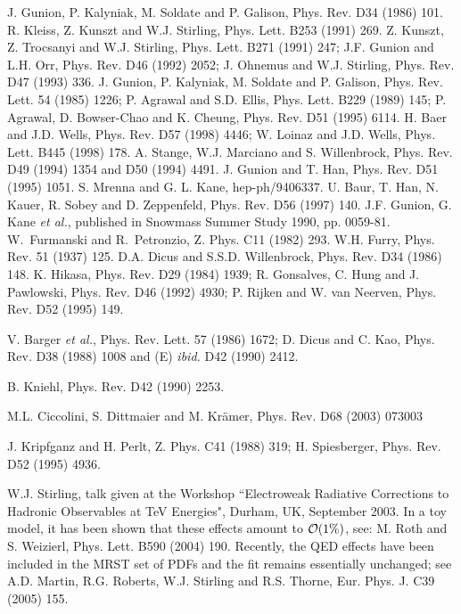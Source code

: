 \begin{thebibliography}{999}
J. Gunion, P. Kalyniak, M. Soldate and P. Galison, Phys. Rev. D34 (1986) 101. 
%
 R. Kleiss, Z. Kunszt and W.J. Stirling, Phys. Lett. 
B253  (1991) 269. 
%
 Z. Kunszt, Z. Trocsanyi and W.J. Stirling, Phys. Lett. 
B271 (1991) 247; J.F. Gunion and L.H. Orr, Phys. Rev. D46 (1992) 2052; 
J. Ohnemus and W.J. Stirling, Phys. Rev. D47 (1993) 336.
%
 J. Gunion, P. Kalyniak, M. Soldate and P. Galison, Phys. 
Rev. Lett. 54 (1985) 1226; P. Agrawal and  S.D. Ellis, Phys. Lett. B229 (1989)
145; P. Agrawal, D. Bowser-Chao and K. Cheung, Phys. Rev. D51 (1995) 6114. 
%
 H. Baer and J.D. Wells, Phys. Rev. D57 (1998) 4446;
W. Loinaz and J.D. Wells, Phys. Lett. B445 (1998) 178.  
 A. Stange, W.J. Marciano and S. Willenbrock,  Phys. 
Rev. D49 (1994) 1354 and D50 (1994) 4491.
%
 J. Gunion and T. Han, Phys. Rev. D51 (1995) 1051.
%
S. Mrenna and G. L. Kane, hep-ph/9406337.  
%
 U. Baur, T. Han, N. Kauer, R. Sobey and D. Zeppenfeld, 
Phys. Rev. D56 (1997) 140. 
%
J.F. Gunion, G. Kane {\it et al.}, published in Snowmass Summer Study 1990, pp. 
0059-81.
%
 W.~Furmanski and R.~Petronzio, Z. Phys. C11 (1982) 293.
%
 W.H. Furry, Phys. Rev. 51 (1937) 125. 
%
 D.A. Dicus and S.S.D. Willenbrock, Phys. Rev. D34 (1986) 148.
%
 K. Hikasa, Phys. Rev. D29 (1984) 1939; R. Gonsalves, C. Hung
and J. Pawlowski, Phys. Rev. D46 (1992) 4930; P. Rijken and W. van 
Neerven, Phys. Rev. D52 (1995) 149.  

 V. Barger {\it et al.}, Phys. Rev. Lett. 57 (1986) 1672; D. Dicus and
C. Kao, Phys. Rev. D38 (1988) 1008 and (E) {\it ibid.} D42 (1990) 2412.

  B. Kniehl, Phys. Rev. D42 (1990) 2253.  

 M.L. Ciccolini, S. Dittmaier and M. Kr\"amer, Phys. Rev. 
D68 (2003) 073003

 J. Kripfganz and H. Perlt, Z. Phys. C41 (1988) 319;  
H. Spiesberger, Phys. Rev. D52 (1995) 4936. 

 W.J. Stirling, talk given at the Workshop ``Electroweak 
Radiative Corrections to Hadronic Observables at TeV Energies", Durham, UK, 
September 2003. In a toy model, it has been shown that these effects amount to 
${\cal O}(1\%)$, see: M. Roth and S. Weizierl, Phys. Lett. B590 (2004) 190. 
Recently, the QED effects have been included in the MRST set of PDFs and the 
fit remains essentially unchanged; see A.D. Martin, R.G. Roberts, W.J. Stirling
and R.S. Thorne, Eur. Phys. J. C39 (2005) 155. 


\end{thebibliography}
